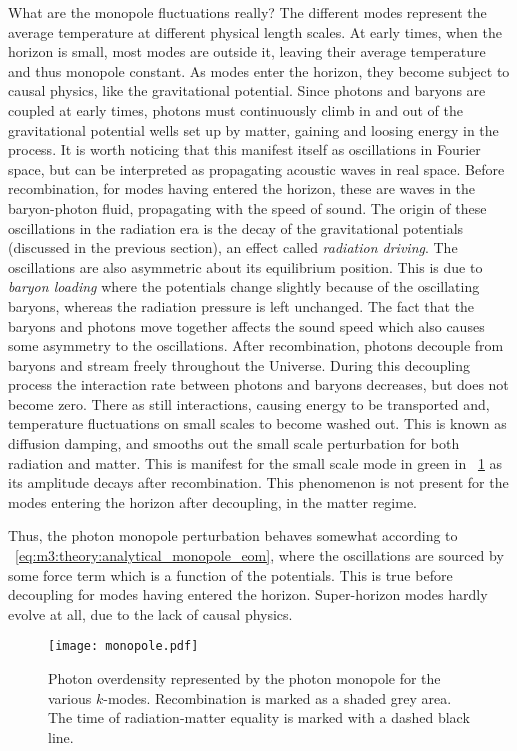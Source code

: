     What are the monopole fluctuations really? The different modes represent the average temperature at different physical length scales. At early times, when the horizon is small, most modes are outside it, leaving their average temperature and thus monopole constant. As modes enter the horizon, they become subject to causal physics, like the gravitational potential. Since photons and baryons are coupled at early times, photons must continuously climb in and out of the gravitational potential wells set up by matter, gaining and loosing energy in the process. It is worth noticing that this manifest itself as oscillations in Fourier space, but can be interpreted as propagating acoustic waves in real space. Before recombination, for modes having entered the horizon, these are waves in the baryon-photon fluid, propagating with the speed of sound. The origin of these oscillations in the radiation era is the decay of the gravitational potentials (discussed in the previous section), an effect called \textit{radiation driving}. The oscillations are also asymmetric about its equilibrium position. This is due to \textit{baryon loading} where the potentials change slightly because of the oscillating baryons, whereas the radiation pressure is left unchanged. The fact that the baryons and photons move together affects the sound speed which also causes some asymmetry to the oscillations. After recombination, photons decouple from baryons and stream freely throughout the Universe. During this decoupling process the interaction rate between photons and baryons decreases, but does not become zero. There as still interactions, causing energy to be transported and, temperature fluctuations on small scales to become washed out. This is known as diffusion damping, and smooths out the small scale perturbation for both radiation and matter. This is manifest for the small scale mode in green in ~\cref{fig:m3:monopole} as its amplitude decays after recombination. This phenomenon is not present for the modes entering the horizon after decoupling, in the matter regime. 

    Thus, the photon monopole perturbation behaves somewhat according to ~\cref{eq:m3:theory:analytical_monopole_eom}, where the oscillations are sourced by some force term which is a function of the potentials. This is true before decoupling for modes having entered the horizon. Super-horizon modes hardly evolve at all, due to the lack of causal physics.
    \begin{figure}
        \texttt{[image: monopole.pdf]}
        \caption{Photon overdensity represented by the photon monopole for the various $k$-modes. Recombination is marked as a shaded grey area. The time of radiation-matter equality is marked with a dashed black line.}
        \label{fig:m3:monopole}
    \end{figure}

